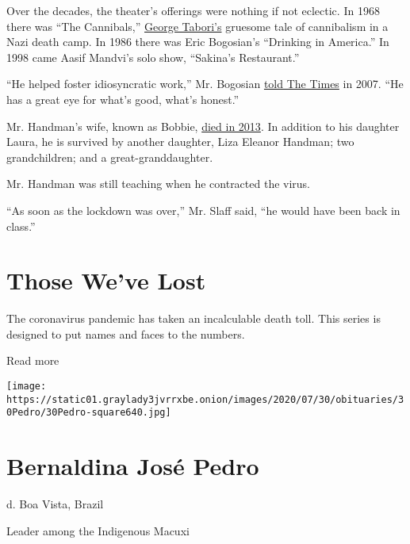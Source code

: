 Over the decades, the theater's offerings were nothing if not eclectic.
In 1968 there was ``The Cannibals,''
\href{https://www.nytimes3xbfgragh.onion/2007/07/27/theater/27tabori.html}{George
Tabori's} gruesome tale of cannibalism in a Nazi death camp. In 1986
there was Eric Bogosian's ``Drinking in America.'' In 1998 came Aasif
Mandvi's solo show, ``Sakina's Restaurant.''

``He helped foster idiosyncratic work,'' Mr. Bogosian
\href{https://www.nytimes3xbfgragh.onion/2007/05/20/nyregion/20wynn.html}{told
The Times} in 2007. ``He has a great eye for what's good, what's
honest.''

Mr. Handman's wife, known as Bobbie,
\href{https://www.nytimes3xbfgragh.onion/2013/11/15/nyregion/bobbie-handman-a-medal-of-arts-winner-dies-at-85.html}{died
in 2013}. In addition to his daughter Laura, he is survived by another
daughter, Liza Eleanor Handman; two grandchildren; and a
great-granddaughter.

Mr. Handman was still teaching when he contracted the virus.

``As soon as the lockdown was over,'' Mr. Slaff said, ``he would have
been back in class.''

\href{https://www.nytimes3xbfgragh.onion/interactive/2020/obituaries/people-died-coronavirus-obituaries.html?action=click\&pgtype=Article\&state=default\&region=BELOW_MAIN_CONTENT\&context=covid_obits_promo}{}

\hypertarget{those-weve-lost}{%
\section{Those We've Lost}\label{those-weve-lost}}

The coronavirus pandemic has taken an incalculable death toll. This
series is designed to put names and faces to the numbers.

Read more

\texttt{[image: https://static01.graylady3jvrrxbe.onion/images/2020/07/30/obituaries/30Pedro/30Pedro-square640.jpg]}

\hypertarget{bernaldina-josuxe9-pedro}{%
\section{Bernaldina José Pedro}\label{bernaldina-josuxe9-pedro}}

d. Boa Vista, Brazil

Leader among the Indigenous Macuxi

